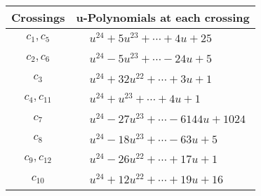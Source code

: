 \documentclass[1p]{elsarticle_modified}
\theoremstyle{definition}
\begin{document}
\begin{tabular}{m{50pt}|m{274pt}}
Crossings & \hspace{64pt}u-Polynomials at each crossing \\
\hline $$\begin{aligned}c_{1},c_{5}\end{aligned}$$&$\begin{aligned}
&u^{24}+5 u^{23}+\cdots+4 u+25
\end{aligned}$\\
\hline $$\begin{aligned}c_{2},c_{6}\end{aligned}$$&$\begin{aligned}
&u^{24}-5 u^{23}+\cdots-24 u+5
\end{aligned}$\\
\hline $$\begin{aligned}c_{3}\end{aligned}$$&$\begin{aligned}
&u^{24}+32 u^{22}+\cdots+3 u+1
\end{aligned}$\\
\hline $$\begin{aligned}c_{4},c_{11}\end{aligned}$$&$\begin{aligned}
&u^{24}+u^{23}+\cdots+4 u+1
\end{aligned}$\\
\hline $$\begin{aligned}c_{7}\end{aligned}$$&$\begin{aligned}
&u^{24}-27 u^{23}+\cdots-6144 u+1024
\end{aligned}$\\
\hline $$\begin{aligned}c_{8}\end{aligned}$$&$\begin{aligned}
&u^{24}-18 u^{23}+\cdots-63 u+5
\end{aligned}$\\
\hline $$\begin{aligned}c_{9},c_{12}\end{aligned}$$&$\begin{aligned}
&u^{24}-26 u^{22}+\cdots+17 u+1
\end{aligned}$\\
\hline $$\begin{aligned}c_{10}\end{aligned}$$&$\begin{aligned}
&u^{24}+12 u^{22}+\cdots+19 u+16
\end{aligned}$\\
\hline
\end{tabular}\\~\\
\end{document}
